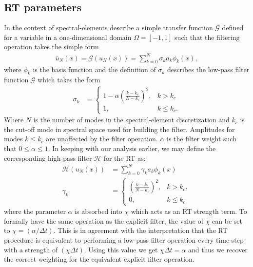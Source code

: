 \subsection{RT parameters}
In the context of spectral-elements \cite{malm13} describe a simple transfer function $\mathcal{G}$ defined for a variable in a one-dimensional domain $\Omega=[-1, 1]$ such that the filtering operation takes the simple form 
\begin{align}
	\bar{u}_{N}(x) = \mathcal{G}(u_{N}(x)) = \sum_{k=0}^{N}\sigma_{k}a_{k}\phi_{k}(x),
\end{align}
where $\phi_{k}$ is the basis function and the definition of $\sigma_{k}$ describes the low-pass filter function $\mathcal{G}$ which takes the form
\begin{align}
\sigma_{k} &=
	\begin{cases}
	1 - \alpha\left(\frac{k-k_{c}}{N-k_{c}}  \right)^{2}, & k>k_{c} \\
	1, & k\le k_{c}.
	\end{cases}
\end{align}
Where $N$ is the number of modes in the spectral-element discretization and $k_{c}$ is the cut-off mode in spectral space used for building the filter. Amplitudes for modes $k\le k_{c}$ are unaffected by the filter operation. $\alpha$ is the filter weight such that $0\le\alpha\le1$. In keeping with our analysis earlier, we may define the corresponding high-pass filter $\mathcal{H}$ for the RT as:
\begin{align}
\mathcal{H}(u_{N}(x)) &= \sum_{k=0}^{N}\gamma_{k}a_{k}\phi_{k}(x) \\
\gamma_{k} &=
\begin{cases}
	\left(\frac{k-k_{c}}{N-k_{c}}  \right)^{2}, & k>k_{c}, \\
	0, & k\le k_{c}
\end{cases}
\end{align}
where the parameter $\alpha$ is absorbed into $\chi$ which acts as an RT strength term. To formally have the same operation as the explicit filter, the value of $\chi$ can be set to $\chi=(\alpha/\Delta t)$. This is in agreement with the interpretation that the RT procedure is equivalent to performing a low-pass filter operation every time-step with a strength of $(\chi\Delta t)$. Using this value we get $\chi\Delta t = \alpha$ and thus we recover the correct weighting for the equivalent explicit filter operation. 

